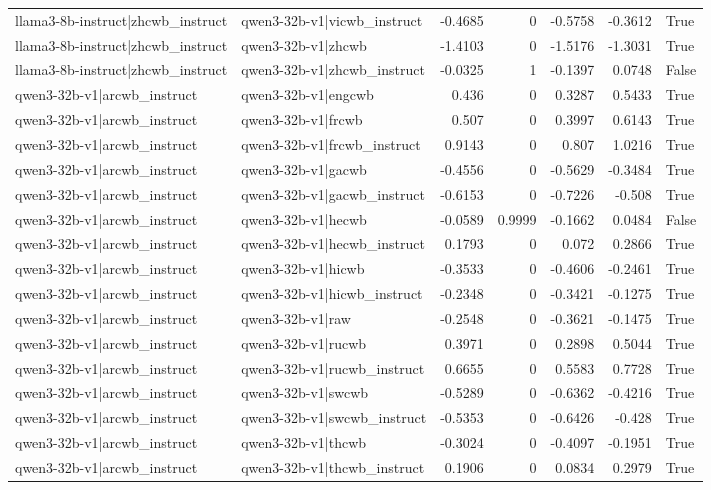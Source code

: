 \begin{table}
\begin{tabular}{l l r r r r l}
llama3-8b-instruct|zhcwb_instruct & qwen3-32b-v1|vicwb_instruct & -0.4685 & 0 & -0.5758 & -0.3612 & True \\
llama3-8b-instruct|zhcwb_instruct & qwen3-32b-v1|zhcwb & -1.4103 & 0 & -1.5176 & -1.3031 & True \\
llama3-8b-instruct|zhcwb_instruct & qwen3-32b-v1|zhcwb_instruct & -0.0325 & 1 & -0.1397 & 0.0748 & False \\
qwen3-32b-v1|arcwb_instruct & qwen3-32b-v1|engcwb & 0.436 & 0 & 0.3287 & 0.5433 & True \\
qwen3-32b-v1|arcwb_instruct & qwen3-32b-v1|frcwb & 0.507 & 0 & 0.3997 & 0.6143 & True \\
qwen3-32b-v1|arcwb_instruct & qwen3-32b-v1|frcwb_instruct & 0.9143 & 0 & 0.807 & 1.0216 & True \\
qwen3-32b-v1|arcwb_instruct & qwen3-32b-v1|gacwb & -0.4556 & 0 & -0.5629 & -0.3484 & True \\
qwen3-32b-v1|arcwb_instruct & qwen3-32b-v1|gacwb_instruct & -0.6153 & 0 & -0.7226 & -0.508 & True \\
qwen3-32b-v1|arcwb_instruct & qwen3-32b-v1|hecwb & -0.0589 & 0.9999 & -0.1662 & 0.0484 & False \\
qwen3-32b-v1|arcwb_instruct & qwen3-32b-v1|hecwb_instruct & 0.1793 & 0 & 0.072 & 0.2866 & True \\
qwen3-32b-v1|arcwb_instruct & qwen3-32b-v1|hicwb & -0.3533 & 0 & -0.4606 & -0.2461 & True \\
qwen3-32b-v1|arcwb_instruct & qwen3-32b-v1|hicwb_instruct & -0.2348 & 0 & -0.3421 & -0.1275 & True \\
qwen3-32b-v1|arcwb_instruct & qwen3-32b-v1|raw & -0.2548 & 0 & -0.3621 & -0.1475 & True \\
qwen3-32b-v1|arcwb_instruct & qwen3-32b-v1|rucwb & 0.3971 & 0 & 0.2898 & 0.5044 & True \\
qwen3-32b-v1|arcwb_instruct & qwen3-32b-v1|rucwb_instruct & 0.6655 & 0 & 0.5583 & 0.7728 & True \\
qwen3-32b-v1|arcwb_instruct & qwen3-32b-v1|swcwb & -0.5289 & 0 & -0.6362 & -0.4216 & True \\
qwen3-32b-v1|arcwb_instruct & qwen3-32b-v1|swcwb_instruct & -0.5353 & 0 & -0.6426 & -0.428 & True \\
qwen3-32b-v1|arcwb_instruct & qwen3-32b-v1|thcwb & -0.3024 & 0 & -0.4097 & -0.1951 & True \\
qwen3-32b-v1|arcwb_instruct & qwen3-32b-v1|thcwb_instruct & 0.1906 & 0 & 0.0834 & 0.2979 & True \\

\end{tabular}
\end{table}
